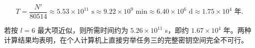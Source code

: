 \begin{equation*}
    T=\frac{N'}{80514}
    \approx5.53\times10^{11}\text{ s}
    \approx9.22\times10^9\text{ min}
    \approx6.40\times10^6\text{ d}
    \approx1.75\times10^4\text{ 年}.
\end{equation*}

若按 $l=6$ 最大项近似，则所需时间约为 $5.26\times10^{11}$ s，即约 $1.67\times10^4$ 年。两种计算结果均表明，在个人计算机上直接穷举任务三的完整密钥空间完全不可行。
